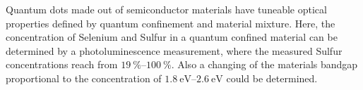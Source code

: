 
Quantum dots made out of semiconductor materials have tuneable optical properties defined by quantum confinement and material mixture. 
Here, the concentration of Selenium and Sulfur in a quantum confined material can be determined by a photoluminescence measurement,
where the measured Sulfur concentrations reach from $\SIrange{19}{100}{\percent}$. Also a changing of the materials bandgap proportional to the concentration 
of $\SIrange{1.8}{2.6}{\eV}$ could be determined.